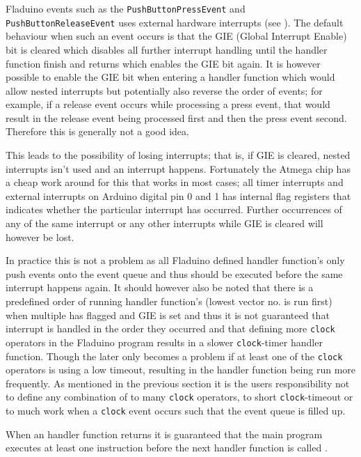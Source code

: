 \documentclass[a4paper, oneside, final]{memoir}
\let\fref\undefined
\begin{document}
Fladuino events such as the \texttt{PushButtonPressEvent} and
\texttt{PushButtonRe\-le\-a\-se\-Event} uses external hardware interrupts (see
\fref{sec:external-interrupts}). The default behaviour when such an event occurs
is that the GIE (Global Interrupt Enable) bit is cleared which disables all
further interrupt handling until the handler function finish and returns which
enables the GIE bit again. It is however possible to enable the GIE bit when
entering a handler function which would allow nested interrupts \cite[Section
4.7 page 14]{atmel8p} but potentially also reverse the order of events; for
example, if a release event occurs while processing a press event, that would
result in the release event being processed first and then the press
event second. Therefore this is generally not a good idea.

This leads to the possibility of losing interrupts; that is, if GIE is cleared,
nested interrupts isn't used and an interrupt happens. Fortunately the Atmega
chip has a cheap work around for this that works in most cases; all timer
interrupts and external interrupts on Arduino digital pin 0 and 1 has internal
flag registers that indicates whether the particular interrupt has
occurred. Further occurrences of any of the same interrupt or any other
interrupts while GIE is cleared will however be lost.

In practice this is not a problem as all Fladuino defined handler function's
only push events onto the event queue and thus should be executed before the
same interrupt happens again. It should however also be noted that there is a
predefined order of running handler function's \cite[Section 9 page 57]{atmel8p}
(lowest vector no. is run first) when multiple has flagged and GIE is set and
thus it is not guaranteed that interrupt is handled in the order they occurred
and that defining more \texttt{clock} operators in the Fladuino program results
in a slower \texttt{clock}-timer handler function. Though the later only becomes
a problem if at least one of the \texttt{clock} operators is using a low
timeout, resulting in the handler function being run more frequently. As
mentioned in the previous section it is the users responsibility not to define
any combination of to many \texttt{clock} operators, to short
\texttt{clock}-timeout or to much work when a \texttt{clock} event occurs such
that the event queue is filled up.

When an handler function returns it is guaranteed that the main program executes
at least one instruction before the next handler function is called
\cite[Section 4.7 page 14]{atmel8p}.
\end{document}
